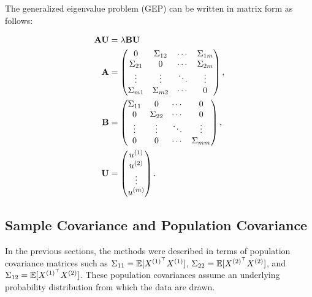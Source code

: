 The generalized eigenvalue problem (GEP) can be written in matrix form as follows:

\begin{align}
    \mathbf{A} \mathbf{U} & = \lambda \mathbf{B} \mathbf{U}                    \\
    \mathbf{A}            & = \begin{pmatrix}
                                  0           & \Sigma_{12} & \cdots & \Sigma_{1m} \\
                                  \Sigma_{21} & 0           & \cdots & \Sigma_{2m} \\
                                  \vdots      & \vdots      & \ddots & \vdots      \\
                                  \Sigma_{m1} & \Sigma_{m2} & \cdots & 0
                              \end{pmatrix}, \\
    \mathbf{B}            & = \begin{pmatrix}
                                  \Sigma_{11} & 0           & \cdots & 0           \\
                                  0           & \Sigma_{22} & \cdots & 0           \\
                                  \vdots      & \vdots      & \ddots & \vdots      \\
                                  0           & 0           & \cdots & \Sigma_{mm}
                              \end{pmatrix}, \\
    \mathbf{U}            & = \begin{pmatrix}
                                  u^{(1)} \\
                                  u^{(2)} \\
                                  \vdots   \\
                                  u^{(m)}
                              \end{pmatrix}.
\end{align}

\subsection{Sample Covariance and Population Covariance}
In the previous sections, the methods were described in terms of population covariance matrices such as \(\Sigma_{11}=\mathbb{E}[X^{(1)^{\top}} X^{(1)}]\), \(\Sigma_{22}=\mathbb{E}[X^{(2)^{\top}} X^{(2)}]\), and \(\Sigma_{12}=\mathbb{E}[X^{(1)^{\top}} X^{(2)}]\). These population covariances assume an underlying probability distribution from which the data are drawn.

